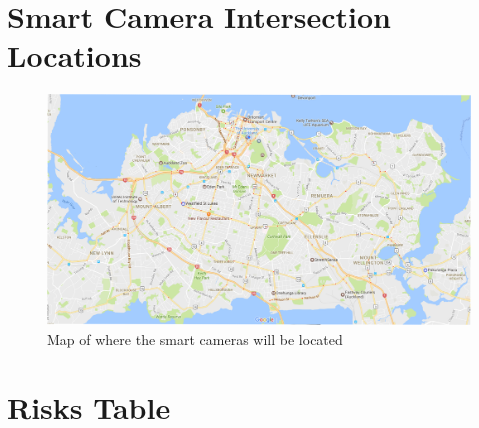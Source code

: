 \documentclass[twoside, a4paper, 11pt]{article}
\begin{document}
\newpage
\section{Smart Camera Intersection Locations}
\begin{figure}[H]
\centering
\includegraphics[width=\textwidth]{CAM.png}
\caption{Map of where the smart cameras will be located}
\label{fig:cammap}
\end{figure}
\section{Risks Table}

\label{tab:risks}

\end{document}
